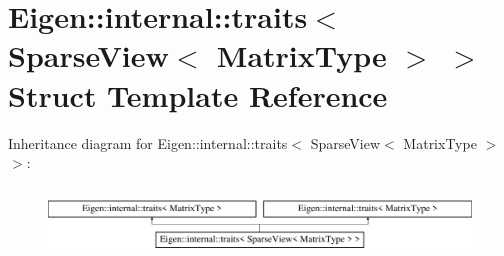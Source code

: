 \hypertarget{struct_eigen_1_1internal_1_1traits_3_01_sparse_view_3_01_matrix_type_01_4_01_4}{}\section{Eigen\+:\+:internal\+:\+:traits$<$ Sparse\+View$<$ Matrix\+Type $>$ $>$ Struct Template Reference}
\label{struct_eigen_1_1internal_1_1traits_3_01_sparse_view_3_01_matrix_type_01_4_01_4}
Inheritance diagram for Eigen\+:\+:internal\+:\+:traits$<$ Sparse\+View$<$ Matrix\+Type $>$ $>$\+:\begin{figure}[H]
\begin{center}
\leavevmode
\includegraphics[height=1.794872cm]{struct_eigen_1_1internal_1_1traits_3_01_sparse_view_3_01_matrix_type_01_4_01_4}
\end{center}
\end{figure}
